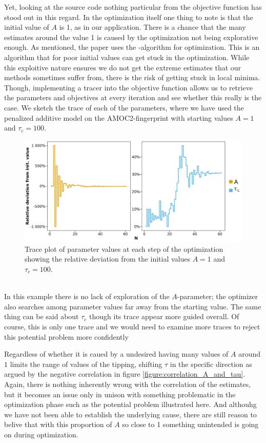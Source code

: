 Yet, looking at the source code nothing particular from the objective function has stood out in this regard. In the optimization itself one thing to note is that the initial value of $A$ is 1, as in our application. There is a chance that the many estimates around the value 1 is caused by the optimization not being explorative enough. As mentioned, the paper uses the -algorithm for optimization. This is an algorithm that for poor initial values can get stuck in the optimization. While this exploitive nature ensures we do not get the extreme estimates that our methods sometimes suffer from, there is the risk of getting stuck in local minima. Though, implementing a tracer into the objective function allows us to retrieve the parameters and objectives at every iteration and see whether this really is the case. We sketch the trace of each of the parameters, where we have used the penalized additive model on the AMOC2-fingerprint with starting values $A = 1$ and $\tau_c = 100$. 
\begin{figure}[h!]
\begin{center}
    \includegraphics[scale = .075]{figures/trace_plot.jpeg}
    \caption{Trace plot of parameter values at each step of the optimization showing the relative deviation from the initial values $A = 1$ and $\tau_c = 100$.}
    \label{figure:trace_plot}
\end{center}
\end{figure}\\
In this example there is no lack of exploration of the $A$-parameter; the optimizer also searches among parameter values far away from the starting value. The same thing can be said about $\tau_c$ though its trace appear more guided overall. Of course, this is only one trace and we would need to examine more traces to reject this potential problem more confidently

Regardless of whether it is caued by a undesired having many values of $A$ around $1$ limits the range of values of the tipping, shifting $\tau$ in the specific direction as argued by the negative correlation in figure \ref{figure:correlation_A_and_tau}. Again, there is nothing inherently wrong with the correlation of the estimates, but it becomes an issue only in unison with something problematic in the optimization phase such as the potential problem illustrated here. And althouhg we have not been able to establish the underlying cause, there are still reason to belive that with this proportion of $A$ so close to 1 something unintended is going on during optimization.  

